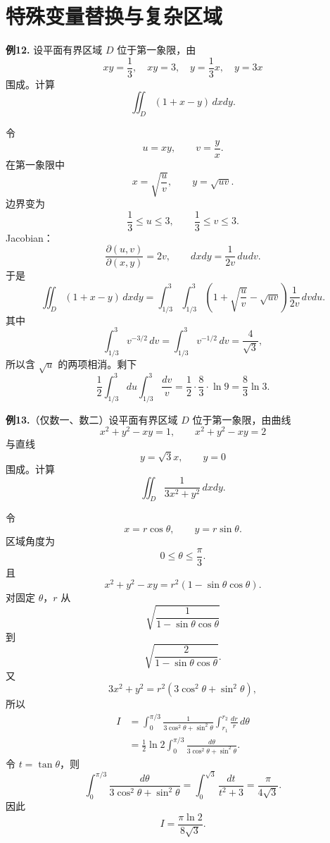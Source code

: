 \section{特殊变量替换与复杂区域}

\begin{problemblock}
\textbf{例12.} 设平面有界区域 \(D\) 位于第一象限，由
\[
xy=\frac13,\quad xy=3,\quad y=\frac13x,\quad y=3x
\]
围成。计算
\[
\iint_D(1+x-y)\,dxdy.
\]
\end{problemblock}
\begin{solutionblock}
令
\[
u=xy,\qquad v=\frac yx.
\]
在第一象限中
\[
x=\sqrt{\frac uv},\qquad y=\sqrt{uv}.
\]
边界变为
\[
\frac13\le u\le3,\qquad \frac13\le v\le3.
\]
Jacobian：
\[
\frac{\partial(u,v)}{\partial(x,y)}
=2v,
\qquad
dxdy=\frac1{2v}\,dudv.
\]
于是
\[
\iint_D(1+x-y)\,dxdy
=\int_{1/3}^3\int_{1/3}^3
\left(1+\sqrt{\frac uv}-\sqrt{uv}\right)\frac1{2v}\,dvdu.
\]
其中
\[
\int_{1/3}^3v^{-3/2}\,dv
=\int_{1/3}^3v^{-1/2}\,dv=\frac4{\sqrt3},
\]
所以含 \(\sqrt u\) 的两项相消。剩下
\[
\frac12\int_{1/3}^3du\int_{1/3}^3\frac{dv}{v}
=\frac12\cdot\frac83\cdot\ln9
=\frac83\ln3.
\]
\end{solutionblock}

\begin{problemblock}
\textbf{例13.}（仅数一、数二）设平面有界区域 \(D\) 位于第一象限，由曲线
\[
x^2+y^2-xy=1,\qquad x^2+y^2-xy=2
\]
与直线
\[
y=\sqrt3x,\qquad y=0
\]
围成。计算
\[
\iint_D\frac1{3x^2+y^2}\,dxdy.
\]
\end{problemblock}
\begin{solutionblock}
令
\[
x=r\cos\theta,\qquad y=r\sin\theta.
\]
区域角度为
\[
0\le\theta\le\frac\pi3.
\]
且
\[
x^2+y^2-xy=r^2(1-\sin\theta\cos\theta).
\]
对固定 \(\theta\)，\(r\) 从
\[
\sqrt{\frac1{1-\sin\theta\cos\theta}}
\]
到
\[
\sqrt{\frac2{1-\sin\theta\cos\theta}}.
\]
又
\[
3x^2+y^2=r^2(3\cos^2\theta+\sin^2\theta),
\]
所以
\[
\begin{aligned}
I&=\int_0^{\pi/3}
\frac{1}{3\cos^2\theta+\sin^2\theta}
\int_{r_1}^{r_2}\frac{dr}{r}\,d\theta\\
&=\frac12\ln2\int_0^{\pi/3}
\frac{d\theta}{3\cos^2\theta+\sin^2\theta}.
\end{aligned}
\]
令 \(t=\tan\theta\)，则
\[
\int_0^{\pi/3}
\frac{d\theta}{3\cos^2\theta+\sin^2\theta}
=\int_0^{\sqrt3}\frac{dt}{t^2+3}
=\frac{\pi}{4\sqrt3}.
\]
因此
\[
I=\frac{\pi\ln2}{8\sqrt3}.
\]
\end{solutionblock}

